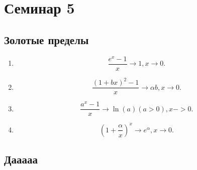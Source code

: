 \section{Семинар 5}

\subsection{Золотые пределы}

\begin{enumerate}
\item 
    \begin{equation*}
        \frac{e^{x} - 1}{x} \to 1, x \to 0
    .\end{equation*}

\item
    \begin{equation*}
        \frac{(1 + bx)^2 - 1}{x} \to \alpha b, x \to 0
    .\end{equation*}

\item
    \begin{equation*}
        \frac{a^{x} - 1}{x} \to \ln(a) (a > 0), x -> 0
    .\end{equation*}

\item
    \begin{equation*}
        \left(1 + \frac{\alpha}{x}\right)^{x} \to e^{\alpha}, x \to 0
    .\end{equation*}
\end{enumerate}

\subsection{Дааааа}

